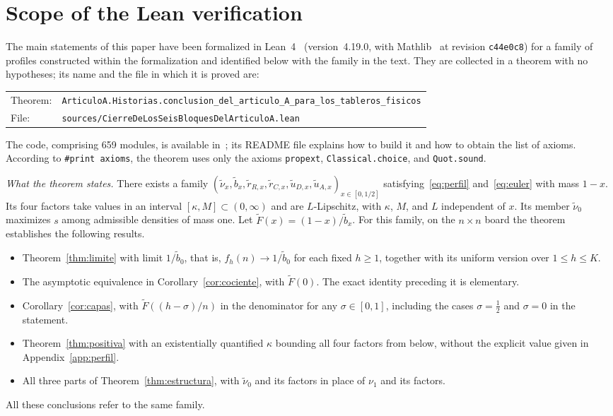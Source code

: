 \section{Scope of the Lean verification}\label{sec:verificacion}

The main statements of this paper have been formalized in Lean~4~\cite{Lean4} (version~4.19.0, with
Mathlib~\cite{Mathlib} at revision
\texttt{c44e0c8}) for a family of profiles constructed within the formalization and identified below with
the family in the text. They
are collected in a theorem with no hypotheses; its name and the file in which it is proved are:
\begin{center}\small
\begin{tabular}{@{}l@{\quad}l@{}}
Theorem: & \texttt{ArticuloA.Historias.conclusion\_del\_articulo\_A\_para\_los\_tableros\_fisicos}\\[2pt]
File: & \texttt{sources/CierreDeLosSeisBloquesDelArticuloA.lean}
\end{tabular}
\end{center}
\noindent The code, comprising 659 modules, is available in~\cite{CodigoLean}; its README file explains how
to build it and how to obtain the
list of axioms. According to \texttt{\#print axioms}, the
theorem uses only the axioms \texttt{propext}, \texttt{Classical.choice}, and \texttt{Quot.sound}.

\emph{What the theorem states.} There exists a family
$(\tilde\nu_x,\tilde b_x,\tilde r_{R,x},\tilde r_{C,x},\tilde u_{D,x},\tilde
u_{A,x})_{x\in[0,1/2]}$ satisfying~\eqref{eq:perfil} and~\eqref{eq:euler} with mass $1-x$. Its four factors
take values in an interval
$[\kappa,M]\subset(0,\infty)$ and are $L$-Lipschitz, with $\kappa$, $M$, and $L$ independent of $x$. Its
member $\tilde\nu_0$ maximizes
$s$ among admissible densities of mass one. Let $\tilde F(x)=(1-x)/\tilde b_x$. For this family, on the
$n\times n$ board the theorem
establishes the following results. \begin{itemize} \item Theorem~\ref{thm:limite} with limit $1/\tilde b_0$,
that is,
$f_h(n)\to1/\tilde b_0$ for each fixed $h\ge1$, together with its uniform version over $1\le h\le K$. \item
The asymptotic equivalence in
Corollary~\ref{cor:cociente}, with $\tilde F(0)$. The exact identity preceding it is elementary. \item
Corollary~\ref{cor:capas}, with
$\tilde F((h-\sigma)/n)$ in the denominator for any $\sigma\in[0,1]$, including the cases $\sigma=\frac12$
and $\sigma=0$ in the
statement. \item Theorem~\ref{thm:positiva} with an existentially quantified $\kappa$ bounding all four
factors from below, without the
explicit value given in Appendix~\ref{app:perfil}. \item All three parts of Theorem~\ref{thm:estructura},
with $\tilde\nu_0$ and its
factors in place of $\nu_1$ and its factors. \end{itemize} All these conclusions refer to the same family.

